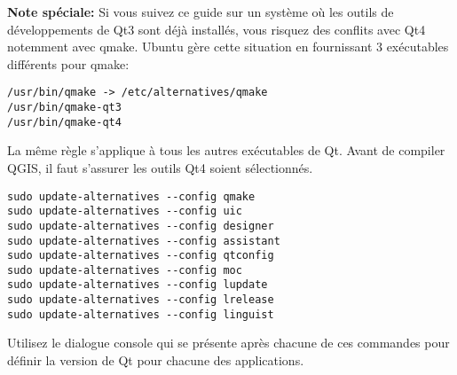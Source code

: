 \textbf{Note spéciale:} Si vous suivez ce guide sur un système où les outils de développements de Qt3 sont déjà installés, vous risquez des conflits avec Qt4 notemment avec qmake. Ubuntu gère cette situation en fournissant 3 exécutables différents pour qmake:

\begin{verbatim}
/usr/bin/qmake -> /etc/alternatives/qmake 
/usr/bin/qmake-qt3
/usr/bin/qmake-qt4 
\end{verbatim}

La même règle s'applique à tous les autres exécutables de Qt. Avant de compiler QGIS, il faut s'assurer les outils Qt4 soient sélectionnés.

\begin{verbatim}
sudo update-alternatives --config qmake
sudo update-alternatives --config uic 
sudo update-alternatives --config designer 
sudo update-alternatives --config assistant 
sudo update-alternatives --config qtconfig 
sudo update-alternatives --config moc 
sudo update-alternatives --config lupdate 
sudo update-alternatives --config lrelease 
sudo update-alternatives --config linguist 
\end{verbatim}

Utilisez le dialogue console qui se présente après chacune de ces commandes pour définir la version de Qt pour chacune des applications.

% 
% 
% 
% 

